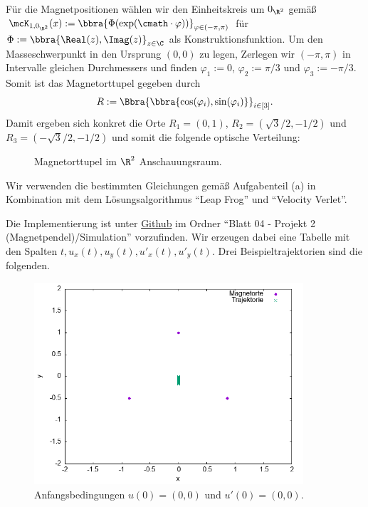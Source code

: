 \documentclass[
    oneside,
    ngerman,
    footinclude=false,
    captions=tableheading,
    DIV=12
]{scrartcl}
\begin{document}
\subaufgabe{}
    Für die Magnetpositionen wählen wir den Einheitskreis um $0_{\R^2}$ gemäß $\mcK_{1,0_{\R^2}}(x):=\bbra{\Phi({\exp}(\cmath\cdot\varphi))}_{\varphi\in(-\pi,\pi)}$ für $\Phi:=\bbra{\Real(z),\Imag(z)}_{z\in\C}$ als Konstruktionsfunktion. Um den Masseschwerpunkt in den Ursprung $(0,0)$ zu legen, Zerlegen wir $(-\pi,\pi)$ in Intervalle gleichen Durchmessers und finden $\varphi_1:=0$, $\varphi_2:=\pi/3$ und $\varphi_3:=-\pi/3$. Somit ist das Magnetorttupel gegeben durch
    \[
        R:=\Bbra{\bbra{\cos(\varphi_i),\sin(\varphi_i)}}_{i\in[3]}.
    \]
    Damit ergeben sich konkret die Orte $R_1 = (0,1)$, $R_2 = (\sqrt{3}/2,-1/2)$ und $R_3 = (-\sqrt{3}/2,-1/2)$ und somit die folgende optische Verteilung:
    \begin{figure}[H]
        \centering
        \caption{Magnetorttupel im $\R^2$ Anschauungsraum.}
    \end{figure}


\subaufgabe{}
    Wir verwenden die bestimmten Gleichungen gemäß Aufgabenteil (a) in Kombination mit dem Lösungsalgorithmus \enquote{Leap Frog} und \enquote{Velocity Verlet}. 

\subaufgabe{}
    Die Implementierung ist unter \href{https://github.com/unb3rechenbar/ComputerPhysik-I-Projekte.git}{Github} im Ordner \enquote{Blatt 04 - Projekt 2 (Magnetpendel)/Simulation} vorzufinden. Wir erzeugen dabei eine Tabelle mit den Spalten $t,u_x(t),u_y(t),u'_x(t),u'_y(t)$. Drei Beispieltrajektorien sind die folgenden.
    \begin{figure}[H]
        \centering
        \includegraphics[width=10cm]{../Simulation/img/trcs/velverl3-0-0-0-0.png}
        \caption{Anfangsbedingungen $u(0) = (0,0)$ und $u'(0) = (0,0)$.}
    \end{figure}
\end{document}
